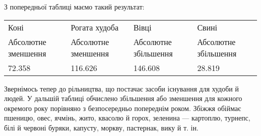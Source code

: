 З попередньої таблиці маємо такий результат:
\begin{center}
  \noindent\begin{tabularx}{\textwidth}{Y Y Y Y}
      Коні & Рогата худоба & Вівці & Свині \\
      Абсолютне зменшення & Абсолютне зменшення & Абсолютне збільшення & Абсолютне збільшення \\
      72.358 & 116.626 & 146.608 & 28.819\\

  \end{tabularx}
\end {center}

Звернімось тепер до рільництва, що постачає засоби існування
для худоби й людей. У дальшій таблиці обчислено збільшення
або зменшення для кожного окремого року порівняно з безпосередньо
попереднім роком. Збіжжя обіймає пшеницю, овес,
ячмінь, жито, квасолю й горох, зеленина — картоплю, турнепс,
білі й червоні буряки, капусту, моркву, пастернак, вику й т. ін.

\setlength{\tabcolsep}{2pt}

